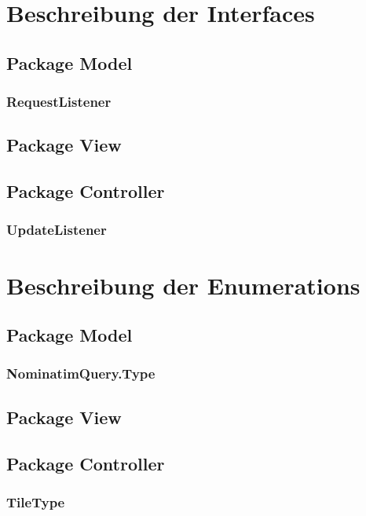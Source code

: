 \documentclass[10pt]{scrreprt}
\begin{document}
\chapter{Beschreibung der Interfaces}

\section{Package Model}

\subsection*{RequestListener}

\section{Package View}

\section{Package Controller}

\subsection*{UpdateListener}




\chapter{Beschreibung der Enumerations}

\section{Package Model}

\subsection*{NominatimQuery.Type}

\section{Package View}

\section{Package Controller}

\subsection*{TileType}
\end{document}
